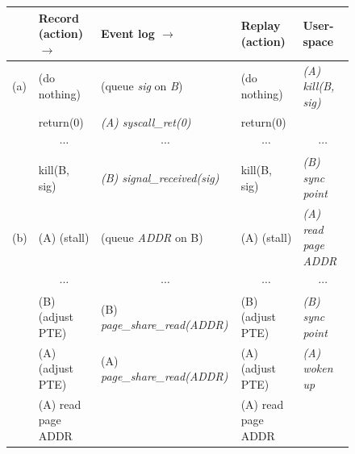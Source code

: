 \begin{figure}[t]
  \small
  \begin{center}
  \begin{tabular}{llll|l}

    \hline	

    & {\bf Record (action) \hfill $\rightarrow$ }
      & {\bf Event log \hfill $\rightarrow$ }
        & {\bf Replay (action)}
          & {\bf User-space}
            \\

    \hline	

    (a)
    & (do nothing)
      & (queue {\em sig} on {\em B})
        & (do nothing)
          & {\em (A) kill(B, sig)}
            \\

    & return(0)
      & {\em (A) syscall\_ret(0)}
        & return(0)
          &
            \\

    & \multicolumn{1}{c}{ $\cdots$}
      & \multicolumn{1}{c}{ $\cdots$}
        & \multicolumn{1}{c}{ $\cdots$}
          & \multicolumn{1}{|c}{ $\cdots$}
            \\

    & kill(B, sig)
      & {\em (B) signal\_received(sig)}
        & kill(B, sig)
          & {\em (B) sync point}
            \\

    \hline	

    (b)
    & (A) (stall)
      & (queue {\em ADDR} on B)
        & (A) (stall)
          & {\em (A) read page ADDR}
            \\

    & \multicolumn{1}{c}{ $\cdots$}
      & \multicolumn{1}{c}{ $\cdots$}
        & \multicolumn{1}{c}{ $\cdots$}
          & \multicolumn{1}{|c}{ $\cdots$}
            \\

    & (B) (adjust PTE)
      & (B) {\em page\_share\_read(ADDR)}
        & (B) (adjust PTE)
          & {\em (B) sync point}
            \\

    & (A) (adjust PTE)
      & (A) {\em page\_share\_read(ADDR)}
        & (A) (adjust PTE)
          & {\em (A) woken up}
            \\

    & (A) read page ADDR
      & 
        & (A) read page ADDR
          &
            \\

    \hline	


\end{tabular}
\end{center}
\end{figure}
